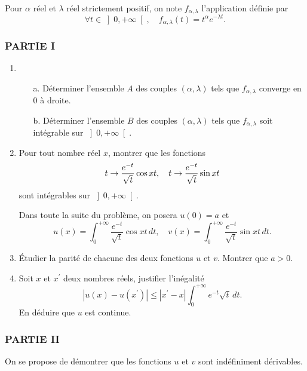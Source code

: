 Pour $\alpha $ r{\'e}el et $\lambda $ r{\'e}el strictement positif, on note $%
f_{\alpha ,\lambda }$ l'application d{\'e}finie par
\[
\forall t\in \left] 0,+\infty \right[ ,\quad f_{\alpha ,\lambda
}(t)=t^\alpha e^{-\lambda t}.
\]

\subsubsection*{PARTIE I}

\begin{enumerate}
\item
\begin{enumerate}
\item[a.]  D{\'e}terminer l'ensemble $A$ des couples $(\alpha ,\lambda )$
tels que $f_{\alpha ,\lambda }$ converge en 0 {\`a} droite.

\item[b.]  D{\'e}terminer l'ensemble $B$ des couples $(\alpha ,\lambda )$
tels que $f_{\alpha ,\lambda }$ soit int{\'e}grable sur $\left] 0,+\infty
\right[ $.
\end{enumerate}

\item  Pour tout nombre r{\'e}el $x$, montrer que les fonctions
\[
t\rightarrow \frac{e^{-t}}{\sqrt{t}}\cos xt,\quad t\rightarrow \frac{e^{-t}}{%
\sqrt{t}}\sin xt
\]
sont int{\'e}grables sur $\left] 0,+\infty \right[ $.

Dans toute la suite du probl{\`e}me, on posera $u(0)=a$ et
\[
u(x)=\int_{0}^{+\infty }\frac{e^{-t}}{\sqrt{t}}\cos xt\,dt,\quad
v(x)=\int_{0}^{+\infty }\frac{e^{-t}}{\sqrt{t}}\sin xt\,dt.
\]

\item  {\'E}tudier la parit{\'e} de chacune des deux fonctions $u$ et $v$.
Montrer que $a>0$.

\item  Soit $x$ et $x^{\prime }$ deux nombres r{\'e}els, justifier
l'in{\'e}galit{\'e}
\[
\left| u(x)-u(x^{\prime })\right| \leq \left| x^{\prime }-x\right|
\int_{0}^{+\infty }e^{-t}\sqrt{t}\,dt.
\]
En d{\'e}duire que $u$ est continue.
\end{enumerate}

\subsubsection*{PARTIE II}

On se propose de d{\'e}montrer que les fonctions $u$ et $v$ sont
ind{\'e}finiment d{\'e}rivables.

